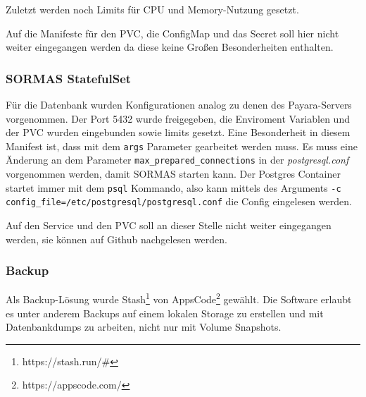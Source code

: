Zuletzt werden noch Limits für \ac{CPU} und Memory-Nutzung gesetzt. 

Auf die Manifeste für den \ac{PVC}, die ConfigMap und das Secret soll hier nicht weiter eingegangen werden da diese keine Großen Besonderheiten enthalten. 

\hfill \newline
\subsubsection{SORMAS StatefulSet}
Für die Datenbank wurden Konfigurationen analog zu denen des Payara-Servers vorgenommen.
Der Port 5432 wurde freigegeben, die Enviroment Variablen und der \ac{PVC} wurden eingebunden sowie limits gesetzt.
Eine Besonderheit in diesem Manifest ist, dass mit dem \texttt{args} Parameter gearbeitet werden muss. 
Es muss eine Änderung an dem Parameter \texttt{max\_prepared\_connections} in der \textit{postgresql.conf} vorgenommen werden, damit \ac{SORMAS} starten kann. 
Der Postgres Container startet immer mit dem \texttt{psql} Kommando, also kann mittels des Arguments \texttt{-c config\_file=/etc/postgresql/postgresql.conf} die Config eingelesen werden.

Auf den Service und den \ac{PVC} soll an dieser Stelle nicht weiter eingegangen werden, sie können auf Github nachgelesen werden. 


\hfill \newline
\subsubsection{Backup}
Als Backup-Lösung wurde Stash\footnote{https://stash.run/\#} von AppsCode\footnote{https://appscode.com/} gewählt.
Die Software erlaubt es unter anderem Backups auf einem lokalen Storage zu erstellen und mit Datenbankdumps zu arbeiten, nicht nur mit Volume Snapshots.

